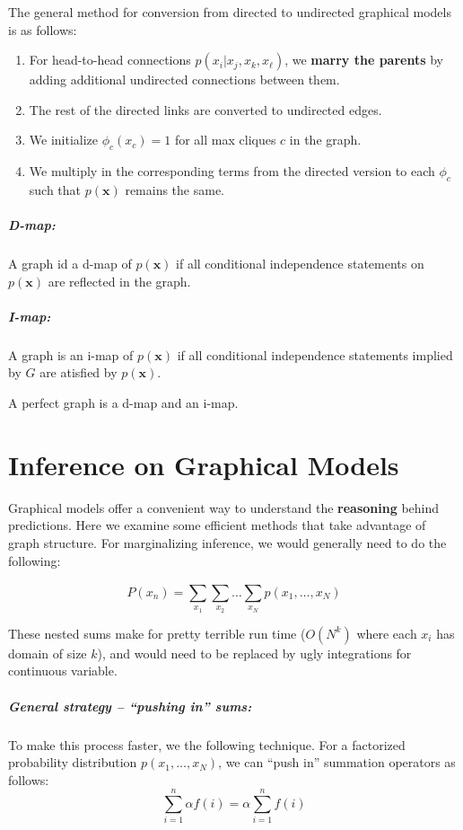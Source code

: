 \documentclass[a4paper,12pt]{report}
\begin{document}
The general method for conversion from directed to undirected graphical models is as follows:
\begin{enumerate}
\item For head-to-head connections $p(x_i | x_j, x_k, x_\ell)$, we \textbf{marry the parents} by adding additional undirected connections between them.
\item The rest of the directed links are converted to undirected edges.
\item We initialize $\phi_c(x_c) = 1$ for all max cliques $c$ in the graph.
\item We multiply in the corresponding terms from the directed version to each $\phi_c$ such that $p(\pmb x)$ remains the same.
\end{enumerate}


\paragraph{D-map: } A graph id a d-map of $p(\pmb x)$ if all conditional independence statements on $p(\pmb x)$ are reflected in the graph.
\paragraph{I-map: } A graph is an i-map of $p(\pmb x)$ if all conditional independence statements implied by $G$ are atisfied by $p(\pmb x)$.


A perfect graph is a d-map and an i-map.



\chapter{Inference on Graphical Models}

Graphical models offer a convenient way to understand the \textbf{reasoning} behind predictions. Here we examine some efficient methods that take advantage of graph structure. For marginalizing inference, we would generally need to do the following:

\begin{equation}
P(x_n) = \sum_{x_1}^{} \sum_{x_2}^{} \dots \sum_{x_N}^{} p(x_1, \dots, x_N)
\end{equation}

These nested sums make for pretty terrible run time ($O(N^k)$ where each $x_i$ has domain of size $k$), and would need to be replaced by ugly integrations for continuous variable.

\paragraph{General strategy -- ``pushing in'' sums: } To make this process faster, we the following technique. For a factorized probability distribution $p(x_1, \dots, x_N)$, we can ``push in'' summation operators as follows:
\begin{equation}
\sum_{i=1}^{n} \alpha f(i) = \alpha \sum_{i=1}^{n} f(i)
\end{equation}
\end{document}
